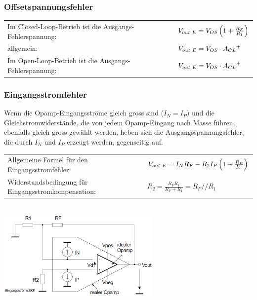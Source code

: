		\subsubsection{Offsetspannungsfehler}
				\begin{tabular}{ll}
					Im Closed-Loop-Betrieb ist die Ausgangs-Fehlerspannung: &
					$V_{out \hspace{1mm}E}=V_{OS}\left( 1+\frac{R_F}{R_1}\right)$\\
          allgemein: &
          $V_{out \hspace{1mm}E}=V_{OS} \cdot {A_{CL}}^{+}$\\
          Im Open-Loop-Betrieb ist die Ausgangs-Fehlerspannung: &
          $V_{out \hspace{1mm}E}=V_{OS}\cdot {A_{CL}}^{+}$\\
         \end{tabular}
		
		\subsubsection{Eingangsstromfehler}
			\begin{minipage}{18cm}
              Wenn die Opamp-Eingangsströme gleich gross sind
              ($I_{N}=I_{P}$) und die Gleichstromwiderstände,
              die von jedem Opamp-Eingang nach Masse führen, 
              ebenfalls gleich gross gewählt werden, heben sich die
              Ausgangsspannungsfehler, die durch $I_{N}$ und $I_{P}$
              erzeugt werden, gegenseitig auf. \\
              \begin{tabular}{ll}
              Allgemeine Formel für den
              Eingangsstromfehler: &
              $V_{out \hspace{1mm}E}=I_N R_F-R_2 I_P\left( 1+\frac{R_F}{R_1} \right)$\\
              Widerstandsbedingung für Eingangsstromkompensation:&
              $R_2=\frac{R_F R_1}{R_F+R_1}=R_F // R_1$\\
            	\end{tabular}
            \end{minipage}\\
			\includegraphics[width=8cm]{./bilder/eingangsstromfehler.png}

